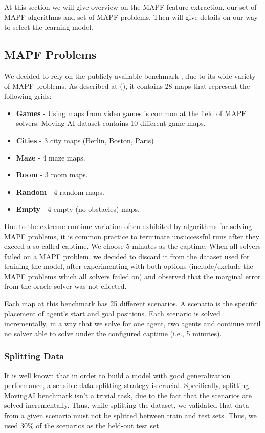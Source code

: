 \documentclass[letterpaper]{article} %
\begin{document}
At this section we will give overview on the MAPF feature extraction, our set of MAPF algorithms and set of MAPF problems. Then will give details on our way to select the learning model.

\subsection{MAPF Problems}
We decided to rely on the publicly available benchmark \footnotemark, due to its wide variety of MAPF problems. As described at (\cite{sturtevant2012benchmarks}), it contains 28 maps that represent the following grids:
\begin{itemize}
  \item \textbf{Games} - Using maps from video games is common at the field of MAPF solvers. Moving AI dataset contains 10 different game maps.
  \item \textbf{Cities} - 3 city maps (Berlin, Boston, Paris) 
  \item \textbf{Maze} - 4 maze maps.
  \item \textbf{Room} - 3 room maps.
  \item \textbf{Random} - 4 random maps.
  \item \textbf{Empty} - 4 empty (no obstacles) maps.
\end{itemize}

Due to the extreme runtime variation often exhibited by algorithms for solving MAPF problems, it is common practice to terminate unsuccessful runs after they exceed a so-called captime.
We choose 5 minutes as the captime.
When all solvers failed on a MAPF problem, we decided to discard it from the dataset used for training the model, after experimenting with both options (include/exclude the MAPF problems which all solvers failed on) and observed that the marginal error from the oracle solver was not effected. 

Each map at this benchmark has 25 different scenarios. A scenario is the specific placement of agent's start and goal positions. Each scenario is solved incrementally, in a way that we solve for one agent, two agents and continue until no solver able to solve under the configured captime (i.e., 5 minutes). 

\subsubsection{Splitting Data}
It is well known that in order to build a model with good generalization performance, a sensible data splitting strategy is crucial. Specifically, splitting MovingAI benchmark isn't a trivial task, due to the fact that the scenarios are solved incrementally. Thus, while splitting the dataset, we validated that data from a given scenario must not be splitted between train and test sets. Thus, we used 30\% of the scenarios as the held-out test set.
\end{document}
